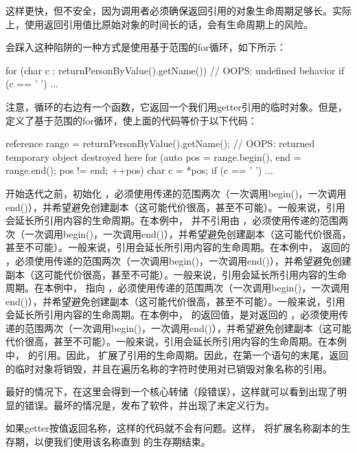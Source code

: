 这样更快，但不安全，因为调用者必须确保返回引用的对象生命周期足够长。实际上，使用返回引用值比原始对象的时间长的话，会有生命周期上的风险。

会踩入这种陷阱的一种方式是使用基于范围的for循环，如下所示：

\begin{cppcode}
for (char c : returnPersonByValue().getName()) { // OOPS: undefined behavior
	if (c == ' ') {
		...
	}
}
\end{cppcode}

注意，循环的右边有一个函数，它返回一个我们用getter引用的临时对象。但是，定义了基于范围的for循环，使上面的代码等价于以下代码：

\begin{cppcode}
reference range = returnPersonByValue().getName();
// OOPS: returned temporary object destroyed here
for (auto pos = range.begin(), end = range.end(); pos != end; ++pos) {
	char c = *pos;
	if (c == ' ') {
		...
	}
}
\end{cppcode}

开始迭代之前，初始化 ，必须使用传递的范围两次（一次调用begin()，一次调用end()），并希望避免创建副本（这可能代价很高，甚至不可能）。一般来说，引用会延长所引用内容的生命周期。在本例中， 并不引用由 ，必须使用传递的范围两次（一次调用begin()，一次调用end()），并希望避免创建副本（这可能代价很高，甚至不可能）。一般来说，引用会延长所引用内容的生命周期。在本例中， 返回的 ，必须使用传递的范围两次（一次调用begin()，一次调用end()），并希望避免创建副本（这可能代价很高，甚至不可能）。一般来说，引用会延长所引用内容的生命周期。在本例中， 指向 ，必须使用传递的范围两次（一次调用begin()，一次调用end()），并希望避免创建副本（这可能代价很高，甚至不可能）。一般来说，引用会延长所引用内容的生命周期。在本例中， 的返回值，是对返回的 ，必须使用传递的范围两次（一次调用begin()，一次调用end()），并希望避免创建副本（这可能代价很高，甚至不可能）。一般来说，引用会延长所引用内容的生命周期。在本例中， 的引用。因此， 扩展了引用的生命周期。因此，在第一个语句的末尾，返回的临时对象将销毁，并且在遍历名称的字符时使用对已销毁对象名称的引用。

最好的情况下，在这里会得到一个核心转储（段错误），这样就可以看到出现了明显的错误。最坏的情况是，发布了软件，并出现了未定义行为。

如果getter按值返回名称，这样的代码就不会有问题。这样， 将扩展名称副本的生存期，以便我们使用该名称直到  的生存期结束。

